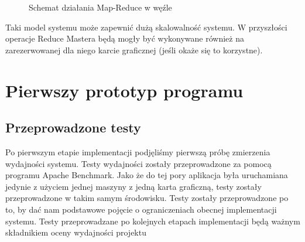 \documentclass[paper=a4, fontsize=11pt]{scrartcl} %
\numberwithin{equation}{section} %
\numberwithin{figure}{section} %
\numberwithin{table}{section} %
\begin{document}
\begin{itemize}
		\begin{figure}[t]
			\begin{center}
				\caption{Schemat działania Map-Reduce w węźle}
			\end{center}
		\end{figure}
\end{itemize}
\clearpage

Taki model systemu może zapewnić dużą skalowalność systemu. W przyszłości operacje Reduce Mastera będą mogły być wykonywane również na zarezerwowanej dla niego karcie graficznej (jeśli okaże się to korzystne).

\section{Pierwszy prototyp programu}

	\subsection{Przeprowadzone testy}
	Po pierwszym etapie implementacji podjęliśmy pierwszą próbę zmierzenia wydajności systemu. Testy wydajności zostały przeprowadzone za pomocą programu Apache Benchmark. Jako że do tej pory aplikacja była uruchamiana jedynie z użyciem jednej maszyny z jedną karta graficzną, testy zostały przeprowadzone w takim samym środowisku. Testy zostały przeprowadzone po to, by dać nam podstawowe pojęcie o ograniczeniach obecnej implementacji systemu. Testy przeprowadzane po kolejnych etapach implementacji będą ważnym składnikiem oceny wydajności projektu
	
\end{document}
